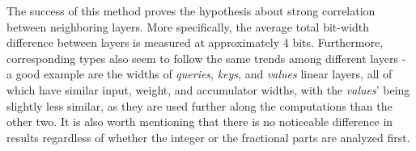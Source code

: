 The success of this method proves the hypothesis about strong correlation between neighboring layers. More specifically, the average total bit-width difference between layers is measured at approximately 4 bits. Furthermore, corresponding types also seem to follow the same trends among different layers - a good example are the widths of \textit{queries}, \textit{keys}, and \textit{values} linear layers, all of which have similar input, weight, and accumulator widths, with the \textit{values}' being slightly less similar, as they are used further along the computations than the other two. It is also worth mentioning that there is no noticeable difference in results regardless of whether the integer or the fractional parts are analyzed first.